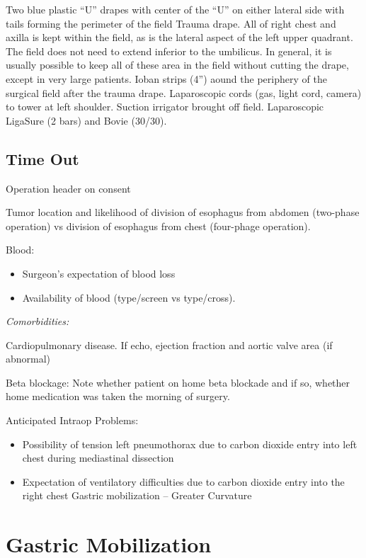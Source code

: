 \documentclass[
  letterpaper,
]{scrbook}
\providecommand{\tightlist}{%
  \setlength{\itemsep}{0pt}\setlength{\parskip}{0pt}}
\begin{document}
Two blue plastic ``U'' drapes with center of the ``U'' on either lateral
side with tails forming the perimeter of the field Trauma drape. All of
right chest and axilla is kept within the field, as is the lateral
aspect of the left upper quadrant. The field does not need to extend
inferior to the umbilicus. In general, it is usually possible to keep
all of these area in the field without cutting the drape, except in very
large patients. Ioban strips (4'') aound the periphery of the surgical
field after the trauma drape. Laparoscopic cords (gas, light cord,
camera) to tower at left shoulder. Suction irrigator brought off field.
Laparoscopic LigaSure (2 bars) and Bovie (30/30).

\subsection{Time Out}\label{time-out}

Operation header on consent

Tumor location and likelihood of division of esophagus from abdomen
(two-phase operation) vs division of esophagus from chest (four-phage
operation).

Blood:

\begin{itemize}
\tightlist
\item
  Surgeon's expectation of blood loss
\item
  Availability of blood (type/screen vs type/cross).
\end{itemize}

\emph{Comorbidities:}

Cardiopulmonary disease. If echo, ejection fraction and aortic valve
area (if abnormal)

Beta blockage: Note whether patient on home beta blockade and if so,
whether home medication was taken the morning of surgery.

Anticipated Intraop Problems:

\begin{itemize}
\tightlist
\item
  Possibility of tension left pneumothorax due to carbon dioxide entry
  into left chest during mediastinal dissection
\item
  Expectation of ventilatory difficulties due to carbon dioxide entry
  into the right chest Gastric mobilization -- Greater Curvature
\end{itemize}

\section{Gastric Mobilization}\label{gastric-mobilization}
\end{document}

